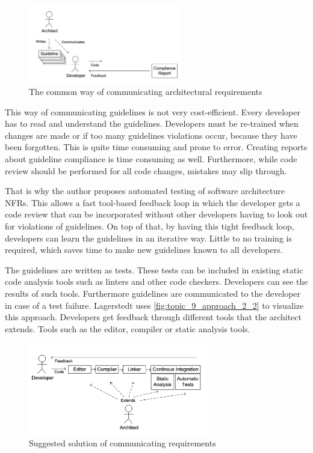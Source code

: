 \begin{figure}[htbp]
	\centering
	\includegraphics[width=0.6\textwidth]{../images/topic_9_approach_2_1.png}
	\caption{The common way of communicating architectural requirements~\cite{Lagerstedt2014}}
	\label{fig:topic_9_approach_2_1}
\end{figure}
\newpage
This way of communicating guidelines is not very cost-efficient.
Every developer has to read and understand the guidelines. Developers must be re-trained when changes are made or if too many guidelines violations occur, because they have been forgotten.
This is quite time consuming and prone to error.  Creating reports about guideline compliance is time consuming as well.
Furthermore, while code review should be performed for all code changes, mistakes may slip through.

That is why the author proposes automated testing of software architecture NFRs.
This allows a fast tool-based feedback loop in which the developer gets a code review that can be incorporated without other developers having to look out for violations of guidelines.
On top of that, by having this tight feedback loop, developers can learn the guidelines in an iterative way.
Little to no training is required, which saves time to make new guidelines known to all developers.

The guidelines are written as tests. These tests can be included in existing static code analysis tools such as linters and other code checkers. Developers can see the results of such tools.
Furthermore guidelines are communicated to the developer in case of a test failure.
Lagerstedt uses \autoref{fig:topic_9_approach_2_2} to visualize this approach.
Developers get feedback through different tools that the architect extends. Tools such as the editor, compiler or static analysis tools.

\begin{figure}[htbp]
	\centering
	\includegraphics[width=0.7\textwidth]{../images/topic_9_approach_2_2.png}
	\caption{Suggested solution of communicating requirements~\cite{Lagerstedt2014}}
	\label{fig:topic_9_approach_2_2}
\end{figure}

